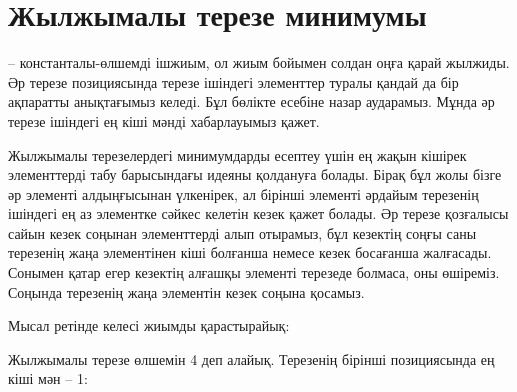 \section{Жылжымалы терезе минимумы}


 -- константалы-өлшемді ішжиым,
ол жиым бойымен солдан оңға қарай жылжиды.
Әр терезе позициясында терезе ішіндегі элементтер туралы
қандай да бір ақпаратты анықтағымыз келеді. Бұл бөлікте 
 есебіне назар аударамыз.
Мұнда әр терезе ішіндегі ең кіші мәнді хабарлауымыз қажет.

Жылжымалы терезелердегі минимумдарды есептеу үшін ең жақын кішірек элементтерді табу барысындағы идеяны қолдануға болады.  
Бірақ бұл жолы бізге әр элементі алдыңғысынан 
үлкенірек, ал бірінші элементі әрдайым терезенің ішіндегі ең аз элементке сәйкес келетін кезек қажет болады. 
Әр терезе қозғалысы сайын кезек соңынан 
элементтерді алып отырамыз, бұл кезектің соңғы саны терезенің жаңа элементінен кіші 
болғанша немесе кезек босағанша жалғасады. Сонымен қатар егер кезектің алғашқы элементі терезеде болмаса,
оны өшіреміз. Соңында терезенің жаңа элементін кезек соңына қосамыз.

Мысал ретінде келесі жиымды қарастырайық:

\begin{center}
\end{center}

Жылжымалы терезе өлшемін 4 деп алайық. Терезенің бірінші позициясында
ең кіші мән -- 1:
\begin{center}
\end{center}

